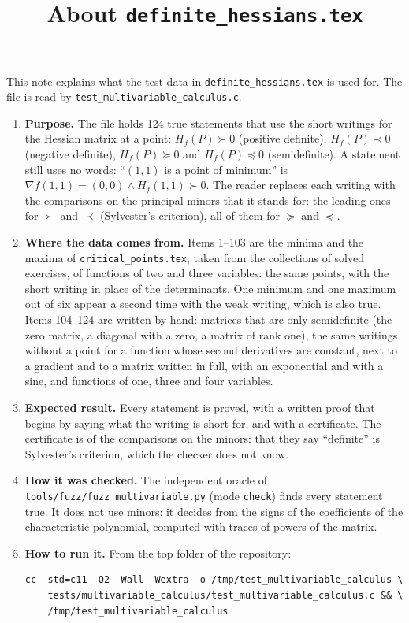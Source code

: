 \documentclass[11pt,a4paper]{article}
\title{About \texttt{definite\_hessians.tex}}
\author{}
\date{}
\begin{document}
\maketitle
This note explains what the test data in \texttt{definite\_hessians.tex} is used for. The file is read by \texttt{test\_multivariable\_calculus.c}.

\begin{enumerate}
\item \textbf{Purpose.} The file holds 124 true statements that use the short writings for the Hessian matrix at a point: $H_{f}(P) \succ 0$ (positive definite), $H_{f}(P) \prec 0$ (negative definite), $H_{f}(P) \succeq 0$ and $H_{f}(P) \preceq 0$ (semidefinite). A statement still uses no words: ``$(1, 1)$ is a point of minimum'' is $\nabla f(1, 1) = (0, 0) \land H_{f}(1, 1) \succ 0$. The reader replaces each writing with the comparisons on the principal minors that it stands for: the leading ones for $\succ$ and $\prec$ (Sylvester's criterion), all of them for $\succeq$ and $\preceq$.

\item \textbf{Where the data comes from.} Items 1--103 are the minima and the maxima of \texttt{critical\_points.tex}, taken from the collections of solved exercises, of functions of two and three variables: the same points, with the short writing in place of the determinants. One minimum and one maximum out of six appear a second time with the weak writing, which is also true. Items 104--124 are written by hand: matrices that are only semidefinite (the zero matrix, a diagonal with a zero, a matrix of rank one), the same writings without a point for a function whose second derivatives are constant, next to a gradient and to a matrix written in full, with an exponential and with a sine, and functions of one, three and four variables.

\item \textbf{Expected result.} Every statement is proved, with a written proof that begins by saying what the writing is short for, and with a certificate. The certificate is of the comparisons on the minors: that they say ``definite'' is Sylvester's criterion, which the checker does not know.

\item \textbf{How it was checked.} The independent oracle of \texttt{tools/fuzz/fuzz\_multivariable.py} (mode \texttt{check}) finds every statement true. It does not use minors: it decides from the signs of the coefficients of the characteristic polynomial, computed with traces of powers of the matrix.

\item \textbf{How to run it.} From the top folder of the repository:
\begin{verbatim}
cc -std=c11 -O2 -Wall -Wextra -o /tmp/test_multivariable_calculus \
    tests/multivariable_calculus/test_multivariable_calculus.c && \
    /tmp/test_multivariable_calculus
\end{verbatim}
\end{enumerate}
\end{document}
